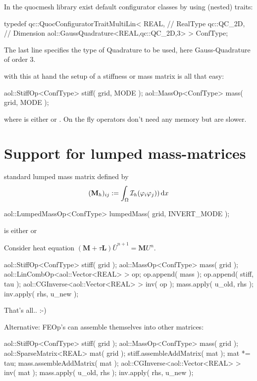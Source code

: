 In the quocmesh library exist default configurator classes by using (nested) traits:
\begin{myverbatim}
typedef
qc::QuocConfiguratorTraitMultiLin<
         REAL,         // RealType
         qc::QC_2D,    // Dimension
         aol::GaussQuadrature<REAL,qc::QC_2D,3> >
ConfType;
\end{myverbatim}
The last line specifies the type of Quadrature to be used, here
Gauss-Quadrature of order $3$.

with this at hand the setup of a stiffness or mass matrix is all that easy:
\begin{myverbatim}
 aol::StiffOp<ConfType> stiff( grid, MODE );
 aol::MassOp<ConfType>  mass( grid, MODE );
\end{myverbatim}
where  is either  or .
On the fly operators don't need any memory but are slower.

\section{Support for lumped mass-matrices}

standard lumped mass matrix defined by
\begin{equation}
(\mathbf{M}_h)_{ij} := \int_\Omega \mathcal{I}_h(\varphi_i \varphi_j)) \,\mathrm{d}x
\end{equation}

\begin{myverbatim}
aol::LumpedMassOp<ConfType>
     lumpedMass( grid, INVERT_MODE );
\end{myverbatim}
 is either  or 


Consider heat equation $(\mathbf{M} + \tau \mathbf{L})\bar U^{n+1} = \mathbf{M}U^{n}$.
\begin{myverbatim}
aol::StiffOp<ConfType> stiff( grid );
aol::MassOp<ConfType>  mass( grid );
aol::LinCombOp<aol::Vector<REAL> > op;
op.append( mass );
op.append( stiff, tau );
aol::CGInverse<aol::Vector<REAL> > inv( op );
mass.apply( u_old, rhs );
inv.apply( rhs, u_new );
\end{myverbatim}

That's all.. :-)


Alternative: FEOp's can assemble themselves into other matrices:
\begin{myverbatim}
aol::StiffOp<ConfType> stiff( grid );
aol::MassOp<ConfType>  mass( grid );
aol::SparseMatrix<REAL> mat( grid );
stiff.assembleAddMatrix( mat );
mat *= tau;
mass.assembleAddMatrix( mat );
aol::CGInverse<aol::Vector<REAL> > inv( mat );
mass.apply( u_old, rhs );
inv.apply( rhs, u_new );
\end{myverbatim}


